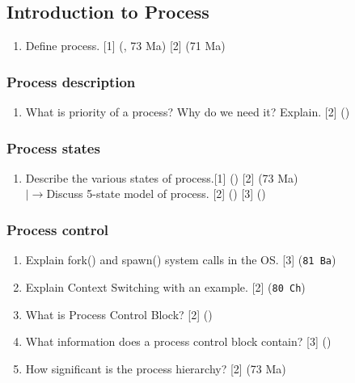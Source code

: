 \documentclass[12pt]{article}
\newcommand{\lb}{\\$\left|\rightarrow\right.$}
\begin{document}
	\subsection{Introduction to Process }
		\begin{enumerate}[noitemsep, topsep = 0pt]
			\item Define process. \hfill [1] (, 73 Ma) [2] (71 Ma)
		\end{enumerate}
	
		\subsubsection{Process description}
			\begin{enumerate}
				\item What is priority of a process? Why do we need it? Explain. \hfill [2] ()
			\end{enumerate}
		
		\subsubsection{Process states}
			\begin{enumerate}[noitemsep, topsep=0pt]
				\item Describe the various states of process.\hfill [1] () [2] (73 Ma)
				\lb Discuss 5-state model of process. \hfill [2] () [3] ()
			\end{enumerate}
		
		\subsubsection{Process control}
			\begin{enumerate}[noitemsep, topsep = 0pt]
				\item Explain fork() and spawn() system calls in the OS. \hfill [3] (\texttt{81 Ba})
				
				\item Explain Context Switching with an example. \hfill [2] (\texttt{80 Ch})
				
				\item What is Process Control Block? \hfill [2] ()		
				
				\item What information does a process control block contain? \hfill [3] ()
				
				\item How significant is the process hierarchy? \hfill [2] (73 Ma)
			\end{enumerate}
	
\end{document}
